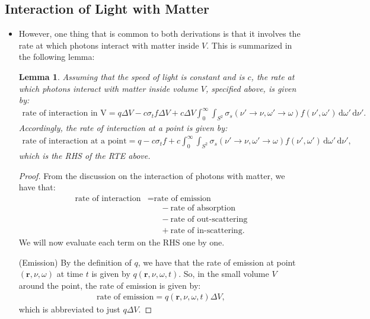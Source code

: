 \documentclass[10pt]{article}
\newtheorem{lemma}{Lemma}[section]
\newcommand{\dee}{\mathrm{d}}
\newcommand{\ve}[1]{\mathbf{#1}}
\newcommand{\ra}{\rightarrow}
\begin{document}
  \subsection{Interaction of Light with Matter}
  \begin{itemize}
    \item However, one thing that is common to both derivations is that it involves the rate at which photons interact with matter inside $V$. This is summarized in the following lemma:
    \begin{lemma} \label{photon-matter-interaction}
      Assuming that the speed of light is constant and is $c$, the rate at which photons interact with matter inside volume $V$, specified above, is given by:
      \begin{align*}
        \mbox{rate of interaction in V} = q \Delta V - c \sigma_t f \Delta V + c \Delta V \int_{0}^\infty \int_{S^2} \sigma_s(\nu' \ra \nu, \omega' \ra \omega) f(\nu', \omega')\, \dee \omega'\, \dee \nu'.
      \end{align*}
      Accordingly, the rate of interaction at a point is given by:
      \begin{align*}
        \mbox{rate of interaction at a point} = q - c \sigma_t f + c \int_{0}^\infty \int_{S^2} \sigma_s(\nu' \ra \nu, \omega' \ra \omega) f(\nu', \omega')\, \dee \omega'\, \dee \nu',
      \end{align*}
      which is the RHS of the RTE above.
    \end{lemma}
    \begin{proof}
      From the discussion on the interaction of photons with matter, we have that:
      \begin{align*}
        \mbox{rate of interaction} 
        &= \mbox{rate of emission}\\
        &\phantom{\ =} - \mbox{rate of absorption} \\
        &\phantom{\ =} - \mbox{rate of out-scattering}\\
        &\phantom{\ =} + \mbox{rate of in-scattering}.
      \end{align*}
      We will now evaluate each term on the RHS one by one.

      (Emission) By the definition of $q$, we have that the rate of emission at point $(\ve{r}, \nu, \omega)$ at time $t$ is given by $q(\ve{r}, \nu, \omega, t)$. So, in the small volume $V$ around the point, the rate of emission is given by:
      \begin{align*}
        \mbox{rate of emission} = q(\ve{r}, \nu, \omega, t) \Delta V,
      \end{align*}
      which is abbreviated to just $q \Delta V$.


\end{proof}
\end{itemize}
\end{document}
